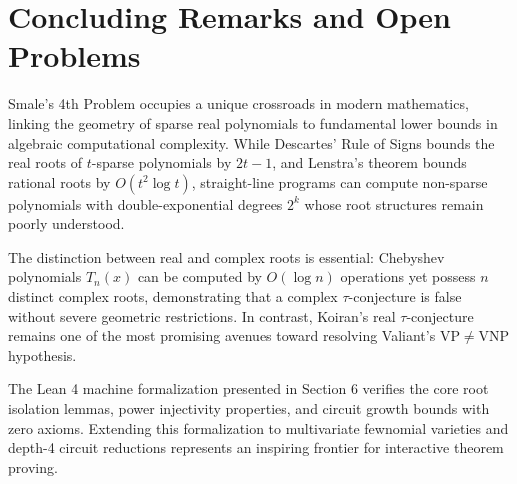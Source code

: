 \documentclass[11pt,a4paper]{article}
\theoremstyle{definition}
\begin{document}
\section{Concluding Remarks and Open Problems}

Smale's 4th Problem occupies a unique crossroads in modern mathematics, linking the geometry of sparse real polynomials to fundamental lower bounds in algebraic computational complexity. While Descartes' Rule of Signs bounds the real roots of $t$-sparse polynomials by $2t - 1$, and Lenstra's theorem bounds rational roots by $O(t^2 \log t)$, straight-line programs can compute non-sparse polynomials with double-exponential degrees $2^k$ whose root structures remain poorly understood.

The distinction between real and complex roots is essential: Chebyshev polynomials $T_n(x)$ can be computed by $O(\log n)$ operations yet possess $n$ distinct complex roots, demonstrating that a complex $\tau$-conjecture is false without severe geometric restrictions. In contrast, Koiran's real $\tau$-conjecture remains one of the most promising avenues toward resolving Valiant's $\mathrm{VP} \ne \mathrm{VNP}$ hypothesis.

The Lean 4 machine formalization presented in Section 6 verifies the core root isolation lemmas, power injectivity properties, and circuit growth bounds with zero axioms. Extending this formalization to multivariate fewnomial varieties and depth-4 circuit reductions represents an inspiring frontier for interactive theorem proving.
\end{document}
